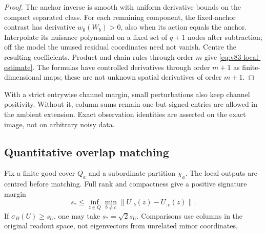 \begin{proof}
The anchor inverse is smooth with uniform derivative bounds on the
compact separated class. For each remaining component, the fixed-anchor
contrast has derivative $w_0(W_b)>0$, also when its action equals the
anchor. Interpolate its nuisance polynomial on a fixed set of $q+1$
nodes after subtraction; off the model the unused residual coordinates
need not vanish. Centre the resulting coefficients. Product and chain
rules through order $m$ give \eqref{eq:v83-local-estimate}. The formulas
have controlled derivatives through order $m+1$ as finite-dimensional
maps; these are not unknown spatial derivatives of order $m+1$.
\end{proof}
With a strict entrywise channel margin, small perturbations also keep
channel positivity. Without it, column sums remain one but signed
entries are allowed in the ambient extension. Exact observation
identities are asserted on the exact image, not on arbitrary noisy data.

\subsection{Quantitative overlap matching}
Fix a finite good cover $Q_a$ and a subordinate partition $\chi_a$.
The local outputs are centred before matching. Full rank and compactness
give a positive signature margin
\begin{equation}\label{eq:v83-signature-gap}
 s_*\le\inf_{z\in Q}\min_{b\ne c}\|U_{:b}(z)-U_{:c}(z)\|.
\end{equation}
If $\sigma_B(U)\ge s_U$, one may take $s_*=\sqrt2s_U$.
Comparisons use columns in the original readout space, not eigenvectors
from unrelated minor coordinates.

